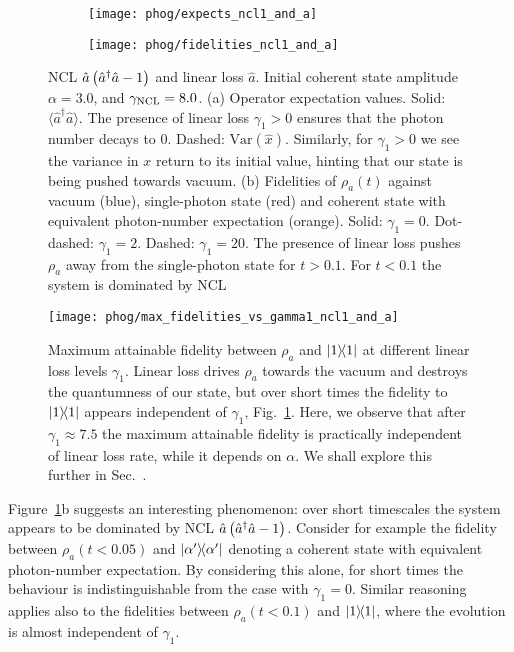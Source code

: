\begin{figure}[htp]
\centering
	\begin{subfigure}{0.6\linewidth}
	\centering
	\texttt{[image: phog/expects\_ncl1\_and\_a]}
	\caption{}
	\end{subfigure}
	\begin{subfigure}{0.6\linewidth}
	\centering
	\texttt{[image: phog/fidelities\_ncl1\_and\_a]}
	\caption{}
	\end{subfigure}
\caption{\label{fig:phog_A_ncl_loss} NCL $\hat{a}\left(\hat{a}^\dagger \hat{a} - 1\right)$ and linear loss $\hat{a}$. Initial coherent state amplitude $\alpha=3.0$, and $\gamma_{\text{NCL}}=8.0$. (a) Operator expectation values. Solid: $\langle \hat{a}^\dagger \hat{a}\rangle$. The presence of linear loss $\gamma_1 > 0$ ensures that the photon number decays to $0$. Dashed: $\text{Var}\left(\hat{x}\right)$. Similarly, for $\gamma_1 > 0$ we see the variance in $x$ return to its initial value, hinting that our state is being pushed towards vacuum. (b) Fidelities of $\rho_a\left(t\right)$ against vacuum (blue), single-photon state (red) and coherent state with equivalent photon-number expectation (orange). Solid: $\gamma_1 = 0$. Dot-dashed: $\gamma_1 = 2$. Dashed: $\gamma_1 = 20$. The presence of linear loss pushes $\rho_a$ away from the single-photon state for $t > 0.1$. For $t < 0.1$ the system is dominated by NCL}
\end{figure}


\begin{figure}[htp]
\centering
\texttt{[image: phog/max\_fidelities\_vs\_gamma1\_ncl1\_and\_a]}
\caption{\label{fig:phog_max_fidelity} Maximum attainable fidelity between $\rho_a$ and $\dyad{1}$ at different linear loss levels $\gamma_1$. Linear loss drives $\rho_a$ towards the vacuum and destroys the quantumness of our state, but over short times the fidelity to $\dyad{1}$ appears independent of $\gamma_1$, Fig.~\ref{fig:phog_A_ncl_loss}. Here, we observe that after $\gamma_1 \approx 7.5$ the maximum attainable fidelity is practically independent of linear loss rate, while it depends on $\alpha$. We shall explore this further in Sec.~.}
\end{figure}

Figure~\ref{fig:phog_A_ncl_loss}b suggests an interesting phenomenon: over short timescales the system appears to be dominated by NCL $\hat{a}\left(\hat{a}^\dagger \hat{a} - 1\right)$. Consider for example the fidelity between $\rho_a\left(t < 0.05\right)$ and $\dyad{\alpha^\prime}$ denoting a coherent state with equivalent photon-number expectation. By considering this alone, for short times the behaviour is indistinguishable from the case with $\gamma_1 = 0$. Similar reasoning applies also to the fidelities between $\rho_a\left(t < 0.1\right)$ and $\dyad{1}$, where the evolution is almost independent of $\gamma_1$.

